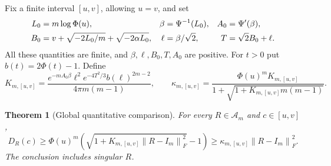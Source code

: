 \documentclass[11pt]{article}
\newtheorem{theorem}{Theorem}
\theoremstyle{remark}\newtheorem{remark}[theorem]{Remark}
\newcommand{\norm}[1]{\left\lVert#1\right\rVert}
\begin{document}
Fix a finite interval $[u,v]$, allowing $u=v$, and set
\begin{align}
 L_0&=m\log\Phi(u),&
 \beta&=\Psi^{-1}(L_0),& A_0&=\Psi'(\beta),\notag\\
 B_0&=v+\sqrt{-2L_0/m}+\sqrt{-2\alpha L_0},&
 \ell&=\beta/\sqrt2,& T&=\sqrt2 B_0+\ell.\label{eq:bounds}
\end{align}
All these quantities are finite, and $\beta,\ell,B_0,T,A_0$ are positive.
For $t>0$ put $b(t)=2\Phi(t)-1$. Define
\begin{equation}\label{eq:K}
 K_{m,[u,v]}=
 \frac{e^{-mA_0\beta}\ell^2e^{-4T^2/3}b(\ell)^{2m-2}}
      {4\pi m(m-1)},\qquad
 \kappa_{m,[u,v]}=
 \frac{\Phi(u)^m K_{m,[u,v]}}
      {1+\sqrt{1+K_{m,[u,v]}m(m-1)}}.
\end{equation}

\begin{theorem}[Global quantitative comparison]\label{thm:global}
For every $R\in\mathcal A_m$ and $c\in[u,v]$,
\begin{equation}\label{eq:global}
 D_R(c)\ge\Phi(u)^m\left(\sqrt{1+K_{m,[u,v]}\norm{R-I_m}_F^2}-1\right)
 \ge\kappa_{m,[u,v]}\norm{R-I_m}_F^2.
\end{equation}
The conclusion includes singular $R$.
\end{theorem}
\end{document}
